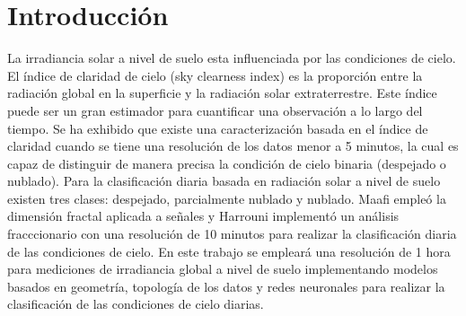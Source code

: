 \section{Introducción}

La irradiancia solar a nivel de suelo esta influenciada por las condiciones  de cielo.  El índice de claridad de cielo (sky clearness index) es la proporción entre la radiación global en la superficie y la radiación solar extraterrestre\cite{Muhammad_1983}. Este índice puede ser un gran estimador para cuantificar una observación a lo largo del tiempo. Se ha exhibido que existe una caracterización basada en el índice de claridad cuando se tiene una resolución de los datos menor a 5 minutos\cite{Suehrcke_1988,Skartveit_1992,Jurado_1995}, la cual es capaz de distinguir de manera precisa la condición de cielo binaria (despejado o nublado). Para la clasificación diaria basada en radiación solar a nivel de suelo existen tres clases: despejado, parcialmente nublado y nublado. Maafi\cite{Maafi_2003} empleó la dimensión fractal aplicada a señales y Harrouni\cite{Harrouni_2005} implementó un análisis fracccionario con una resolución de 10 minutos para realizar la clasificación diaria de las condiciones de cielo. En este trabajo se empleará una resolución de 1 hora para mediciones de irradiancia global a nivel de suelo implementando modelos basados en geometría, topología de los datos y redes neuronales para realizar la clasificación de las condiciones de cielo diarias.
